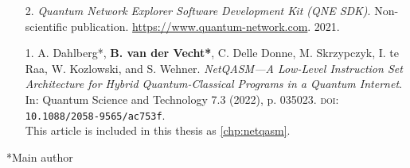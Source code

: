 \begin{enumerate}[label={\arabic*.},itemsep=0.7\baselineskip,parsep=0.3\baselineskip]
    \item[2.]
        \textit{Quantum Network Explorer Software Development Kit (QNE SDK)}.
        Non-scientific publication.
        \url{https://www.quantum-network.com}.
        2021.

    \item[1.]
        A. Dahlberg*, \textbf{B. van der Vecht*}, C. Delle Donne, M. Skrzypczyk, I. te Raa, W. Kozlowski, and S. Wehner.
        \textit{NetQASM---A Low-Level Instruction Set Architecture for Hybrid Quantum-Classical Programs in a Quantum Internet}.
        In: Quantum Science and Technology 7.3 (2022), p. 035023.
        {\small \textsc{doi:}} \texttt{10.1088/2058-9565/ac753f}.
        \\ \ficon This article is included in this thesis as \cref{chp:netqasm}.
\end{enumerate}

\vskip 5mm
\centerline{*Main author}

\begin{xstretch}
\printbibliography[heading=subbibintoc,title={References},notcategory=noprint]
\end{xstretch}

